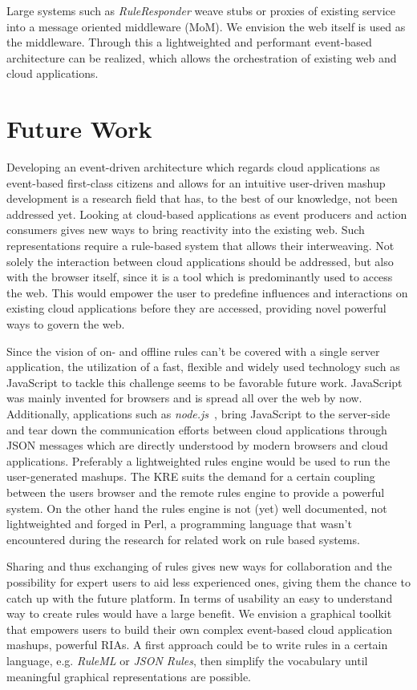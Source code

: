 \documentclass[11pt]{article}%
\begin{document}
Large systems such as \emph{RuleResponder} weave stubs or proxies of existing service into a message oriented middleware (MoM). We envision the web itself is used as the middleware. Through this a lightweighted and performant event-based architecture can be realized, which allows the orchestration of existing web and cloud applications.

\section{Future Work}
Developing an event-driven architecture which regards cloud applications as event-based first-class citizens and allows for an intuitive user-driven mashup development is a research field that has, to the best of our knowledge, not been addressed yet. Looking at cloud-based applications as event producers and action consumers gives new ways to bring reactivity into the existing web. Such representations require a rule-based system that allows their interweaving. Not solely the interaction between cloud applications should be addressed, but also with the browser itself, since it is a tool which is predominantly used to access the web. This would empower the user to predefine influences and interactions on existing cloud applications before they are accessed, providing novel powerful ways to govern the web.

Since the vision of on- and offline rules can't be covered with a single server application, the utilization of a fast, flexible and widely used technology such as JavaScript to tackle this challenge seems to be favorable future work. JavaScript was mainly invented for browsers and is spread all over the web by now. Additionally, applications such as \emph{node.js}~\cite{wwwnodejs}, bring JavaScript to the server-side and tear down the communication efforts between cloud applications through JSON messages which are directly understood by modern browsers and cloud applications.
Preferably a lightweighted rules engine would be used to run the user-generated mashups. The KRE suits the demand for a certain coupling between the users browser and the remote rules engine to provide a powerful system. On the other hand the rules engine is not (yet) well documented, not lightweighted and forged in Perl, a programming language that wasn't encountered during the research for related work on rule based systems.

Sharing and thus exchanging of rules gives new ways for collaboration and the possibility for expert users to aid less experienced ones, giving them the chance to catch up with the future platform. 
In terms of usability an easy to understand way to create rules would have a large benefit. We envision a graphical toolkit that empowers users to build their own complex event-based cloud application mashups, powerful RIAs.
A first approach could be to write rules in a certain language, e.g. \emph{RuleML} or \emph{JSON Rules}, then simplify the vocabulary until meaningful graphical representations are possible.
\end{document}
